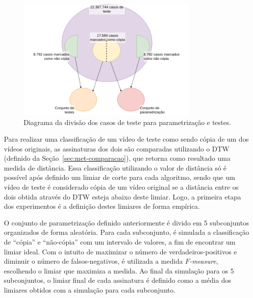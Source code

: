\begin{figure}[h]
    \centering
    \caption{Diagrama da divisão dos casos de teste para parametrização e testes.}
    \label{fig:casosteste}
  
    \includegraphics[width=0.8\textwidth]{dados/figuras/Casos}
    
    
\end{figure}




Para realizar uma classificação de um vídeo de teste como sendo cópia de um dos vídeos originais, as assinaturas dos dois são comparadas utilizando o DTW (definido da Seção~\ref{sec:met-comparacao}), que retorna como resultado uma medida de distância. Essa classificação utilizando o valor de distância só é possível após definido um limiar de corte para cada algoritmo, sendo que um vídeo de teste é considerado cópia de um vídeo original se a distância entre os dois obtida através do DTW esteja abaixo deste limiar. Logo, a primeira etapa dos experimentos é a definição destes limiares de forma empírica.

O conjunto de parametrização definido anteriormente é divido em 5 subconjuntos organizados de forma aleatória. Para cada subconjunto, é simulada a classificação de ``cópia'' e ``não-cópia'' com um intervalo de valores, a fim de encontrar um limiar ideal. Com o intuito de maximizar o número de verdadeiros-positivos e diminuir o número de falsos-negativos, é utilizada a medida \textit{$F$-measure}, escolhendo o limiar que maximiza a medida. Ao final da simulação para os 5 subconjuntos, o limiar final de cada assinatura é definido como a média dos limiares obtidos com a simulação para cada subconjunto.

